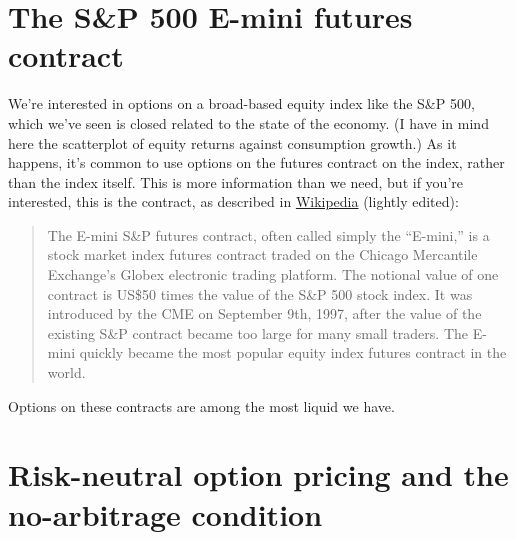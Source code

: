 \documentclass[11pt]{article}
\begin{document}
\section{The S\&P 500 E-mini futures contract}

We're interested in options on a broad-based equity index
like the S\&P 500,
which we've seen is closed related to the state of the economy.
(I have in mind here the scatterplot of equity returns against
consumption growth.)
As it happens, it's common to use options on the futures contract on the index,
rather than the index itself.
This is more information than we need,
but if you're interested, this is the contract,
as described in
\href{http://en.wikipedia.org/wiki/E-mini_S&P}{Wikipedia}
(lightly edited):
%
\begin{quote}
The E-mini S\&P futures contract,
often called simply the ``E-mini,''
is a stock market index futures contract traded
on the Chicago Mercantile Exchange's Globex electronic trading platform.
The notional value of one contract is US\$50 times the value of the S\&P 500 stock index.
It was introduced by the CME on September 9th, 1997,
after the value of the existing S\&P contract became too large for many small traders.
The E-mini quickly became the most popular equity index futures contract in the world.
\end{quote}

Options on these contracts are among the most liquid we have.



\section{Risk-neutral option pricing and the no-arbitrage condition}
\end{document}

